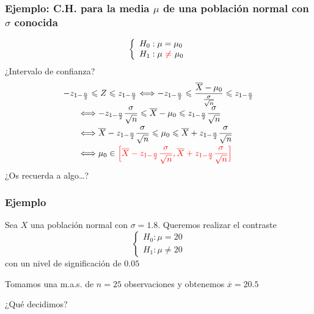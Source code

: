 \documentclass[12pt,t]{beamer}\usepackage[]{graphicx}\usepackage[]{color}
\newcommand{\red}[1]{\textcolor{red}{#1}}
\renewcommand{\leq}{\leqslant}
\theoremstyle{plain}
\theoremstyle{definition}
\begin{document}
\begin{frame}
\frametitle{Ejemplo: C.H. para la media   $\mu$ de una población   normal con $\sigma$ conocida}

\vspace*{-0.75cm}

$$
\left\{\begin{array}{l}
H_{0}:\mu=\mu_{0}\\ H_{1}:\mu\ \red{\neq}\ \mu_{0}
\end{array}
\right.
$$
¿Intervalo de confianza?
$$
\begin{array}{l}
\displaystyle -z_{1-\frac{\alpha}2}\leq Z\leq z_{1-\frac{\alpha}2}\Longleftrightarrow -z_{1-\frac{\alpha}2}\leq \dfrac{\overline{X}-\mu_0}{\frac{\sigma}{\sqrt{n}}}\leq z_{1-\frac{\alpha}2}\\[2ex]
 \displaystyle\qquad\Longleftrightarrow -z_{1-\frac{\alpha}2}\frac{\sigma}{\sqrt{n}}\leq \overline{X}-\mu_0\leq z_{1-\frac{\alpha}2}\frac{\sigma}{\sqrt{n}} \\[2ex]
\displaystyle  \qquad\Longleftrightarrow \overline{X}-z_{1-\frac\alpha2}\frac{\sigma}{\sqrt{n}}\leq \mu_0\leq \overline{X}+z_{1-\frac{\alpha}2}\frac{\sigma}{\sqrt{n}} \\[2ex]
\displaystyle  \qquad\Longleftrightarrow\mu_0\in \red{\Big[\overline{X}-z_{1-\frac\alpha2}\frac{\sigma}{\sqrt{n}},\overline{X}+z_{1-\frac{\alpha}2}\frac{\sigma}{\sqrt{n}}\Big]}
   \end{array}
$$
¿Os recuerda a algo\ldots?
\end{frame}





\begin{frame}
\frametitle{Ejemplo}
Sea $X$ una población normal con $\sigma=1.8$. Queremos realizar el contraste
$$
\left\{\begin{array}{l}
H_{0}:\mu=20\\ H_{1}:\mu\neq 20
\end{array}
\right.
$$
con un nivel   de significación   de $0.05$
\medskip

Tomamos una m.a.s. de $n=25$ observaciones y obtenemos  $\overline{x}=20.5$
\medskip

¿Qué decidimos?
\end{frame}
\end{document}
